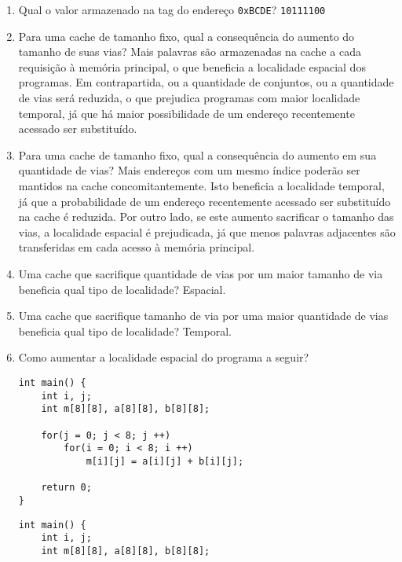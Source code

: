 \documentclass{article}
\begin{document}
\begin{enumerate}
\item Qual o valor armazenado na tag do endereço \verb|0xBCDE|? \verb|10111100|

\item Para uma cache de tamanho fixo, qual a consequência do aumento do tamanho de suas vias? Mais palavras são armazenadas na cache a cada requisição à memória principal, o que beneficia a localidade espacial dos programas. Em contrapartida, ou a quantidade de conjuntos, ou a quantidade de vias será reduzida, o que prejudica programas com maior localidade temporal, já que há maior possibilidade de um endereço recentemente acessado ser substituído.

\item Para uma cache de tamanho fixo, qual a consequência do aumento em sua quantidade de vias? Mais endereços com um mesmo índice poderão ser mantidos na cache concomitantemente. Isto beneficia a localidade temporal, já que a probabilidade de um endereço recentemente acessado ser substituído na cache é reduzida. Por outro lado, se este aumento sacrificar o tamanho das vias, a localidade espacial é prejudicada, já que menos palavras adjacentes são transferidas em cada acesso à memória principal.

\item Uma cache que sacrifique quantidade de vias por um maior tamanho de via beneficia qual tipo de localidade? Espacial.

\item Uma cache que sacrifique tamanho de via por uma maior quantidade de vias beneficia qual tipo de localidade? Temporal.

\item Como aumentar a localidade espacial do programa a seguir?

\begin{center}
    \begin{minipage}{0.575\textwidth}
        \begin{lstlisting}[frame=single]
int main() {
    int i, j;
    int m[8][8], a[8][8], b[8][8]; 
    
    for(j = 0; j < 8; j ++)
        for(i = 0; i < 8; i ++)
            m[i][j] = a[i][j] + b[i][j];
    
    return 0;
}
        \end{lstlisting}
    \end{minipage}
\end{center}

\begin{center}
    \begin{minipage}{0.575\textwidth}
        \begin{lstlisting}[frame=single]
int main() {
    int i, j;
    int m[8][8], a[8][8], b[8][8]; 
    

\end{lstlisting}
\end{minipage}
\end{center}
\end{enumerate}
\end{document}
